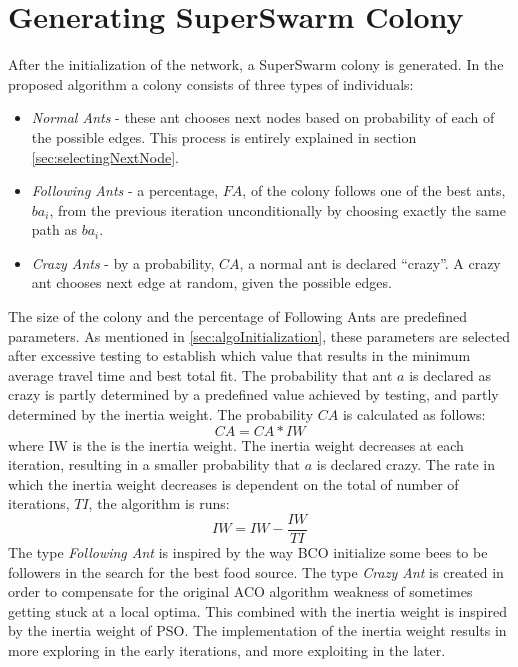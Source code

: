 \section{Generating SuperSwarm Colony}
\label{sec:algoGeneratingSuperSwarm}
After the initialization of the network, a SuperSwarm colony is generated. In the proposed algorithm a colony consists of three types of individuals:
\begin{itemize}
\item \textit{Normal Ants} - these ant chooses next nodes based on probability of each of the possible edges. This process is entirely explained in section \vref{sec:selectingNextNode}.
\item \textit{Following Ants} - a percentage, $FA$, of the colony follows one of the best ants, $ba_i$, from the previous iteration unconditionally by choosing exactly the same path as $ba_i$.
\item \textit{Crazy Ants} - by a probability, $CA$, a normal ant is declared ``crazy''. A crazy ant chooses next edge at random, given the possible edges.  
\end{itemize}

The size of the colony and the percentage of Following Ants are predefined parameters. As mentioned in \vref{sec:algoInitialization}, these parameters are selected after excessive testing to establish which value that results in the minimum average travel time and best total fit. The probability that ant $a$ is declared as crazy is partly determined by a predefined value achieved by testing, and partly determined by the inertia weight. The probability $CA$ is calculated as follows: 
\newline
$$CA = CA*IW$$
\newline
where IW is the is the inertia weight. The inertia weight decreases at each iteration, resulting in a smaller probability that $a$ is declared crazy. The rate in which the inertia weight decreases is dependent on the total of number of iterations, $TI$, the algorithm is runs:
\newline
$$IW = IW - \frac{IW}{TI}$$
\newline
The type \textit{Following Ant} is inspired by the way BCO initialize some bees to be followers in the search for the best food source. The type \textit{Crazy Ant} is created in order to compensate for the original ACO algorithm weakness of sometimes getting stuck at a local optima. This combined with the inertia weight is inspired by the inertia weight of PSO. The implementation of the inertia weight results in more exploring in the early iterations, and more exploiting in the later. 